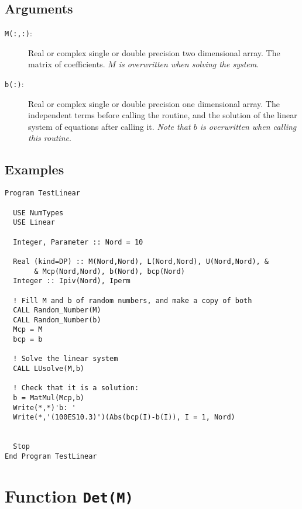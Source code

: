 \subsection{Arguments}

\begin{description}
\item[\texttt{M(:,:)}: ] Real or complex single or double precision two
  dimensional array. The matrix of coefficients. \emph{$M$ is
    overwritten when solving the system}. 
\item[\texttt{b(:)}: ] Real or complex single or double precision one
  dimensional 
  array. The independent terms before calling the routine, and the
  solution of the linear system of equations after calling
  it. \emph{Note that $b$ is overwritten when calling this routine}.  
\end{description}

\subsection{Examples}

\begin{lstlisting}[emph=LUsolve,
                   emphstyle=\color{blue},
                   frame=trBL,
                   caption=Solving systems of linear equations.,
                   label=lusolve]
Program TestLinear

  USE NumTypes
  USE Linear

  Integer, Parameter :: Nord = 10

  Real (kind=DP) :: M(Nord,Nord), L(Nord,Nord), U(Nord,Nord), &
       & Mcp(Nord,Nord), b(Nord), bcp(Nord)
  Integer :: Ipiv(Nord), Iperm

  ! Fill M and b of random numbers, and make a copy of both
  CALL Random_Number(M)
  CALL Random_Number(b)
  Mcp = M
  bcp = b

  ! Solve the linear system
  CALL LUsolve(M,b)
  
  ! Check that it is a solution:
  b = MatMul(Mcp,b)
  Write(*,*)'b: '
  Write(*,'(100ES10.3)')(Abs(bcp(I)-b(I)), I = 1, Nord)


  Stop
End Program TestLinear
\end{lstlisting}


\section{Function \texttt{Det(M)}}

